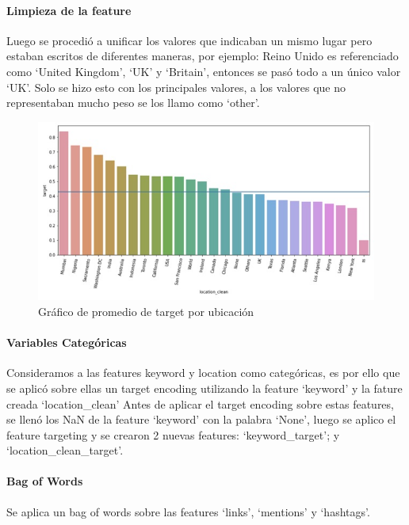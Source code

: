 \documentclass[12pt]{article}
\begin{document}
\paragraph{Limpieza de la feature\\}
Luego se procedió a unificar los valores que indicaban un mismo lugar pero estaban escritos de diferentes maneras, por ejemplo: Reino Unido es referenciado como ‘United Kingdom’, ‘UK’ y ‘Britain’, entonces se pasó todo a un único valor ‘UK’.
Solo se hizo esto con los principales valores, a los valores que no representaban mucho peso se los llamo como ‘other’.

\begin{figure}[H]
    \centering
    \includegraphics[scale = 0.7]{imgs/graph_1.jpg}
    \caption{Gráfico de promedio de target por ubicación}
    \label{tp:fig:equilibrium}
\end{figure}

\paragraph{Variables Categóricas\\}
Consideramos a las features keyword y location como categóricas, es por ello que se aplicó sobre ellas un target encoding utilizando la feature ‘keyword’ y la fature creada ‘location\_clean’
Antes de aplicar el target encoding sobre estas features, se llenó los NaN de la feature ‘keyword’ con la palabra ‘None’, luego se aplico el feature targeting y se crearon 2 nuevas features: ‘keyword\_target’; y ‘location\_clean\_target’.


\paragraph{Bag of Words\\}
Se aplica un bag of words sobre las features ‘links’, ‘mentions’ y ‘hashtags’.
\end{document}
